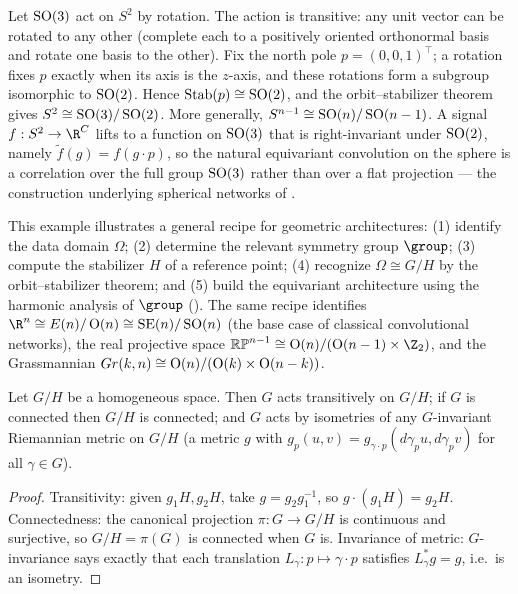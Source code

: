 \begin{example}
\label{ex:found:sphere}
Let $\operatorname{SO}(3)$ act on $S^2$ by rotation. The action is transitive: any unit vector
can be rotated to any other (complete each to a positively oriented orthonormal
basis and rotate one basis to the other). Fix the north pole $p = (0,0,1)^\top$;
a rotation fixes $p$ exactly when its axis is the $z$-axis, and these rotations
form a subgroup isomorphic to $\operatorname{SO}(2)$. Hence $\operatorname{Stab}(p) \cong \operatorname{SO}(2)$, and the
orbit--stabilizer theorem gives $S^2 \cong \operatorname{SO}(3)/\operatorname{SO}(2)$. More generally,
$S^{n-1} \cong \operatorname{SO}(n)/\operatorname{SO}(n-1)$. A signal $f : S^2 \to \R^C$ lifts to a function
on $\operatorname{SO}(3)$ that is right-invariant under $\operatorname{SO}(2)$, namely
$\tilde f(g) = f(g\cdot p)$, so the natural equivariant convolution on the sphere
is a correlation over the full group $\operatorname{SO}(3)$ rather than over a flat projection
--- the construction underlying spherical networks of
.
\end{example}

This example illustrates a general recipe for geometric architectures: (1)
identify the data domain $\Omega$; (2) determine the relevant symmetry group
$\group$; (3) compute the stabilizer $H$ of a reference point; (4) recognize
$\Omega \cong G/H$ by the orbit--stabilizer theorem; and (5) build the
equivariant architecture using the harmonic analysis of $\group$
(). The same recipe identifies $\R^n \cong E(n)/\Orth(n)
\cong \SE(n)/\SO(n)$ (the base case of classical convolutional networks), the
real projective space $\mathbb{RP}^{n-1} \cong \Orth(n)/(\Orth(n-1) \times \Z_2)$,
and the Grassmannian $Gr(k,n) \cong \operatorname{O}(n)/(\operatorname{O}(k) \times \operatorname{O}(n-k))$.

\begin{proposition}
\label{prop:found:homogeneous-props}
Let $G/H$ be a homogeneous space. Then $G$ acts transitively on $G/H$; if $G$ is
connected then $G/H$ is connected; and $G$ acts by isometries of any
$G$-invariant Riemannian metric on $G/H$ (a metric $g$ with $g_p(u,v) =
g_{\gamma\cdot p}(d\gamma_p u, d\gamma_p v)$ for all $\gamma \in G$).
\end{proposition}

\begin{proof}
Transitivity: given $g_1 H, g_2 H$, take $g = g_2 g_1^{-1}$, so $g\cdot(g_1 H) =
g_2 H$. Connectedness: the canonical projection $\pi : G \to G/H$ is continuous
and surjective, so $G/H = \pi(G)$ is connected when $G$ is. Invariance of metric:
$G$-invariance says exactly that each translation $L_\gamma : p \mapsto
\gamma\cdot p$ satisfies $L_\gamma^* g = g$, i.e.\ is an isometry.
\end{proof}

